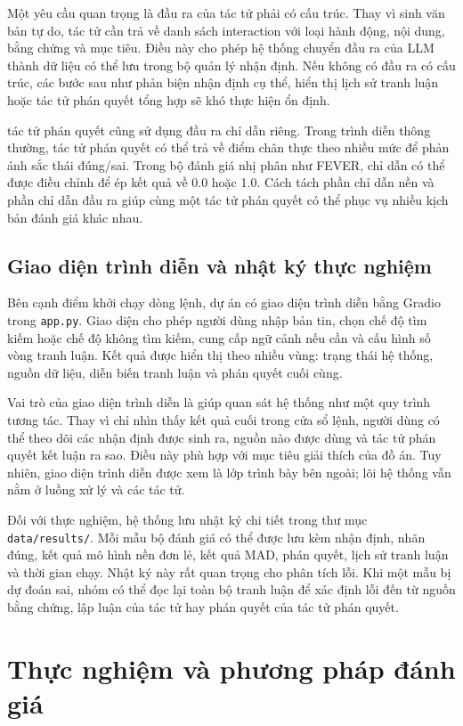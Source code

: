 ﻿\documentclass[oneside,a4paper,12pt]{extreport}
\begin{document}
Một yêu cầu quan trọng là đầu ra của tác tử phải có cấu trúc. Thay vì sinh văn bản tự do, tác tử cần trả về danh sách interaction với loại hành động, nội dung, bằng chứng và mục tiêu. Điều này cho phép hệ thống chuyển đầu ra của LLM thành dữ liệu có thể lưu trong bộ quản lý nhận định. Nếu không có đầu ra có cấu trúc, các bước sau như phản biện nhận định cụ thể, hiển thị lịch sử tranh luận hoặc tác tử phán quyết tổng hợp sẽ khó thực hiện ổn định.

tác tử phán quyết cũng sử dụng đầu ra chỉ dẫn riêng. Trong trình diễn thông thường, tác tử phán quyết có thể trả về điểm chân thực theo nhiều mức để phản ánh sắc thái đúng/sai. Trong bộ đánh giá nhị phân như FEVER, chỉ dẫn có thể được điều chỉnh để ép kết quả về 0.0 hoặc 1.0. Cách tách phần chỉ dẫn nền và phần chỉ dẫn đầu ra giúp cùng một tác tử phán quyết có thể phục vụ nhiều kịch bản đánh giá khác nhau.

\section{Giao diện trình diễn và nhật ký thực nghiệm}

Bên cạnh điểm khởi chạy dòng lệnh, dự án có giao diện trình diễn bằng Gradio trong \texttt{app.py}. Giao diện cho phép người dùng nhập bản tin, chọn chế độ tìm kiếm hoặc chế độ không tìm kiếm, cung cấp ngữ cảnh nếu cần và cấu hình số vòng tranh luận. Kết quả được hiển thị theo nhiều vùng: trạng thái hệ thống, nguồn dữ liệu, diễn biến tranh luận và phán quyết cuối cùng.

Vai trò của giao diện trình diễn là giúp quan sát hệ thống như một quy trình tương tác. Thay vì chỉ nhìn thấy kết quả cuối trong cửa sổ lệnh, người dùng có thể theo dõi các nhận định được sinh ra, nguồn nào được dùng và tác tử phán quyết kết luận ra sao. Điều này phù hợp với mục tiêu giải thích của đồ án. Tuy nhiên, giao diện trình diễn được xem là lớp trình bày bên ngoài; lõi hệ thống vẫn nằm ở luồng xử lý và các tác tử.

Đối với thực nghiệm, hệ thống lưu nhật ký chi tiết trong thư mục \texttt{data/results/}. Mỗi mẫu bộ đánh giá có thể được lưu kèm nhận định, nhãn đúng, kết quả mô hình nền đơn lẻ, kết quả MAD, phán quyết, lịch sử tranh luận và thời gian chạy. Nhật ký này rất quan trọng cho phân tích lỗi. Khi một mẫu bị dự đoán sai, nhóm có thể đọc lại toàn bộ tranh luận để xác định lỗi đến từ nguồn bằng chứng, lập luận của tác tử hay phán quyết của tác tử phán quyết.
\chapter{Thực nghiệm và phương pháp đánh giá}
\end{document}
